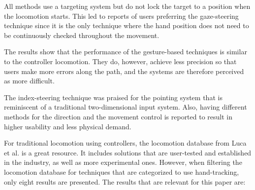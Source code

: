 All methods use a targeting system but do not lock the target to a position when the locomotion starts. This led to reports of users preferring the gaze-steering technique since it is the only technique where the hand position does not need to be continuously checked throughout the movement.

The results show that the performance of the gesture-based techniques is similar to the controller locomotion. They do, however, achieve less precision so that users make more errors along the path, and the systems are therefore perceived as more difficult. 

The index-steering technique was praised for the pointing system that is reminiscent of a traditional two-dimensional input system. Also, having different methods for the direction and the movement control is reported to result in higher usability and less physical demand. 



For traditional locomotion using controllers, the locomotion database from Luca et al. \cite{Luca} is a great resource. It includes solutions that are user-tested and established in the industry, as well as more experimental ones. However, when filtering the locomotion database for techniques that are categorized to use hand-tracking, only eight results are presented.
The results that are relevant for this paper are:

